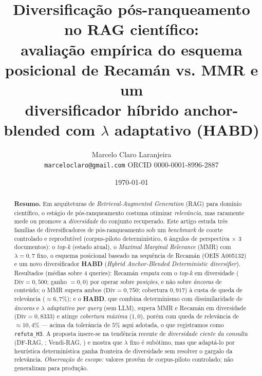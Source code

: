 \documentclass[11pt,a4paper]{article}
\title{\textbf{Diversificação pós-ranqueamento no RAG científico:\\
avaliação empírica do esquema posicional de Recamán vs. MMR e um\\
diversificador híbrido anchor-blended com $\lambda$ adaptativo (HABD)}}
\author{
  Marcelo Claro Laranjeira\\
  \small \texttt{marceloclaro@gmail.com} \quad ORCID 0000-0001-8996-2887
}
\date{\today}
\newcommand{\Div}{\mathrm{Div}}
\begin{document}
\maketitle

\begin{abstract}
\noindent\textbf{Resumo.} Em arquiteturas de \textit{Retrieval-Augmented
Generation} (RAG) para domínio científico, o estágio de pós-ranqueamento costuma
otimizar \emph{relevância}, mas raramente mede ou promove a \emph{diversidade}
do conjunto recuperado. Este artigo estuda três famílias de diversificadores de
pós-ranqueamento sob um \emph{benchmark} de coorte controlado e reprodutível
(corpus-piloto determinístico, 6 ângulos de perspectiva $\times$ 3 documentos):
o \emph{top-k} (estado atual), o \emph{Maximal Marginal Relevance} (MMR) com
$\lambda=0{,}7$ fixo, o esquema posicional baseado na sequência de Recamán
(OEIS A005132) e um novo diversificador \textbf{HABD} (\emph{Hybrid
Anchor-Blended Deterministic diversifier}). Resultados (médias sobre 4 queries):
Recamán \emph{empata} com o \emph{top-k} em diversidade ($\Div{=}0{,}500$;
ganho $=0{,}0$) por operar sobre \emph{posições}, e não sobre \emph{âncoras} de
conteúdo; o MMR supera ambos ($\Div{=}0{,}750$; cobertura $0{,}917$) à custa de
queda de relevância ($\approx 6{,}7\%$); e o \textbf{HABD}, que combina
determinismo com dissimilaridade de \emph{âncoras} e \emph{$\lambda$
adaptativo por query} (sem LLM), supera MMR e Recamán em diversidade
($\Div{=}0{,}8333$) e atinge \emph{cobertura máxima} ($1{,}0$), porém com queda
de relevância de $\approx 10{,}4\%$ — acima da tolerância de $5\%$ aqui
adotada, o que registramos como \texttt{refuta\_H3}. A proposta insere-se na
tendência recente de \emph{diversidade ciente da consulta} (DF-RAG,
; Vendi-RAG, ) e mostra
que $\lambda$ fixo é subótimo, mas que adaptá-lo por heurística determinística
ganha fronteira de diversidade sem resolver o gargalo da
relevância. \emph{Observação de escopo:} valores provêm de corpus-piloto
controlado; não generalizam para produção.


\end{abstract}
\end{document}
